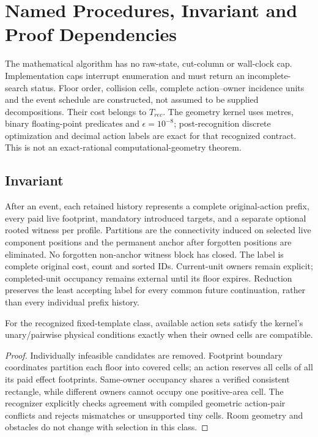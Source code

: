 \section{Named Procedures, Invariant and Proof Dependencies}\label{app:procedures}
The mathematical algorithm has no raw-state, cut-column or wall-clock cap.
Implementation caps interrupt enumeration and must return an incomplete-search
status. Floor order, collision cells, complete action--owner incidence units and
the event schedule are constructed, not assumed to be supplied decompositions.
Their cost belongs to $T_{rec}$. The geometry kernel uses metres, binary
floating-point predicates and $\epsilon=10^{-8}$; post-recognition discrete
optimization and decimal action labels are exact for that recognized contract.
This is not an exact-rational computational-geometry theorem.

\subsection{Invariant}
After an event, each retained history represents a complete original-action
prefix, every paid live footprint, mandatory introduced targets, and a separate
optional rooted witness per profile. Partitions are the connectivity induced on
selected live component positions and the permanent anchor after forgotten
positions are eliminated. No forgotten non-anchor witness block has closed.
The label is complete original cost, count and sorted IDs. Current-unit owners
remain explicit; completed-unit occupancy remains external until its floor
expires. Reduction preserves the least accepting label for every common future
continuation, rather than every individual prefix history.

\begin{lemma}\label{lem:r2-recognition}
For the recognized fixed-template class, available action sets satisfy the
kernel's unary/pairwise physical conditions exactly when their owned cells are
compatible.
\end{lemma}
\begin{proof}
Individually infeasible candidates are removed. Footprint boundary coordinates
partition each floor into covered cells; an action reserves all cells of all
its paid effect footprints. Same-owner occupancy shares a verified consistent
rectangle, while different owners cannot occupy one positive-area cell. The
recognizer explicitly checks agreement with compiled geometric action-pair
conflicts and rejects mismatches or unsupported tiny cells. Room geometry and
obstacles do not change with selection in this class.
\end{proof}

